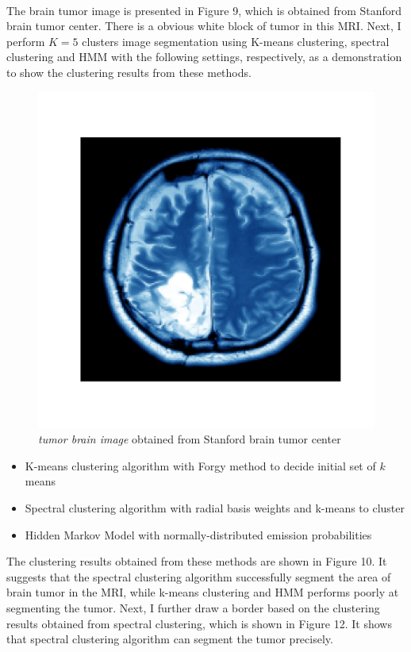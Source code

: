 \documentclass[a4paper]{article}
\begin{document}
\

The brain tumor image is presented in Figure 9, which is obtained from Stanford brain tumor center. There is a obvious white block of tumor in this MRI. Next, I perform $K=5$ clusters image segmentation using K-means clustering, spectral clustering and HMM with the following settings, respectively, as a demonstration to show the clustering results from these methods.


\begin{figure}[h!]
  \centering
  \includegraphics[width=0.4\linewidth]{../Cluster_results/MRI/MRI.png}
  \caption{\textit{tumor brain image} obtained from Stanford brain tumor center}
\end{figure}



\begin{itemize}
	\item K-means clustering algorithm with Forgy method to decide initial set of $k$ means
	\item Spectral clustering algorithm with radial basis weights and k-means to cluster
	\item Hidden Markov Model with normally-distributed emission probabilities
\end{itemize}

The clustering results obtained from these methods are shown in Figure 10. It suggests that the spectral clustering algorithm successfully segment the area of brain tumor in the MRI, while k-means clustering and HMM performs poorly at segmenting the tumor. Next, I further draw a border based on the clustering results obtained from spectral clustering, which is shown in Figure 12. It shows that spectral clustering algorithm can segment the tumor precisely.
\end{document}

